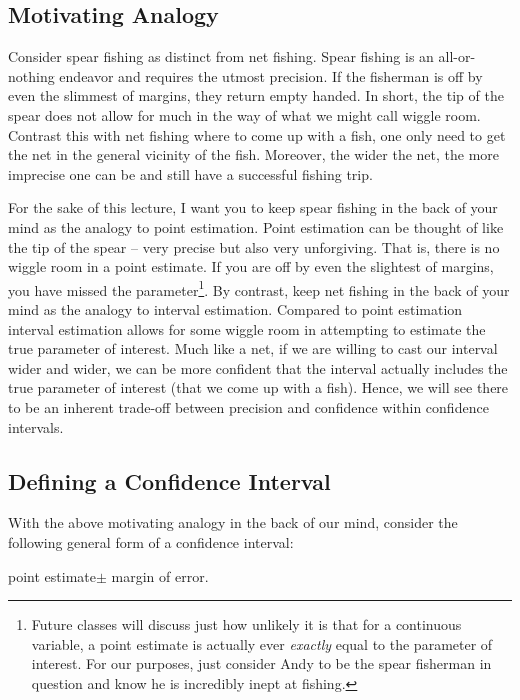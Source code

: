 \documentclass[11pt]{article}
\begin{document}
\subsection{Motivating Analogy} 
Consider spear fishing as distinct from net fishing.  Spear fishing is an all-or-nothing endeavor and requires the utmost precision.  If the fisherman is off by even the slimmest of margins, they return empty handed.  In short, the tip of the spear does not allow for much in the way of what we might call wiggle room.  Contrast this with net fishing where to come up with a fish, one only need to get the net in the general vicinity of the fish.  Moreover, the wider the net, the more imprecise one can be and still have a successful fishing trip.  

For the sake of this lecture, I want you to keep spear fishing in the back of your mind as the analogy to point estimation.  Point estimation can be thought of like the tip of the spear -- very precise but also very unforgiving.  That is, there is no wiggle room in a point estimate.  If you are off by even the slightest of margins, you have missed the parameter\footnote{Future classes will discuss just how unlikely it is that for a continuous variable, a point estimate is actually ever \textit{exactly} equal to the parameter of interest.  For our purposes, just consider Andy to be the spear fisherman in question and know he is incredibly inept at fishing.}.  By contrast, keep net fishing in the back of your mind as the analogy to interval estimation.  Compared to point estimation interval estimation allows for some wiggle room in attempting to estimate the true parameter of interest.  Much like a net, if we are willing to cast our interval wider and wider, we can be more confident that the interval actually includes the true parameter of interest (that we come up with a fish).  Hence, we will see there to be an inherent trade-off between precision and confidence within confidence intervals.  

\subsection{Defining a Confidence Interval} 

With the above motivating analogy in the back of our mind, consider the following general form of a confidence interval: 

\begin{center}
point estimate$\pm$ margin of error.  
\end{center}
\end{document}
